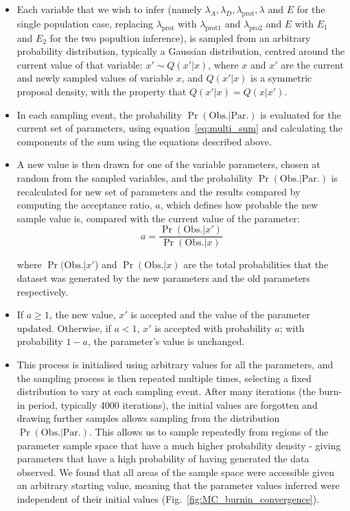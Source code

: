\begin{itemize}
\item Each variable that we wish to infer (namely $\lambda_A, \lambda_D, \lambda_{\text{prot}}, \lambda$ and $E$ for the single population case, replacing $\lambda_{\text{prot}}$ with $\lambda_{\text{prot1}}$ and $\lambda_{\text{pro2}}$ and $E$ with $E_1$ and $E_2$ for the two popultion inference), is sampled from an arbitrary probability distribution, typically a Gaussian distribution, centred around the current value of that variable: $x' \sim Q(x'|x) $, where $x$ and $x'$ are the current and newly sampled values of variable $x$, and $Q(x'|x)$ is a symmetric proposal density, with the property that $Q(x'|x) = Q(x|x')$. 
\item In each sampling event, the probability $\Pr(\text{Obs.} | \text{Par.})$ is evaluated for the current set of parameters, using equation~\ref{eq:multi_sum} and calculating the components of the sum using the equations described above.  

\item A new value is then drawn for one of the variable parameters, chosen at random from the sampled variables, and the probability $\Pr(\text{Obs.} | \text{Par.})$ is recalculated for new set of parameters and the results compared by computing the acceptance ratio, $a$, which defines how probable the new sample value is, compared with the current value of the parameter:
\begin{equation}
a = \frac{\Pr(\text{Obs.} | x')}{\Pr(\text{Obs.} | x)}
\end {equation}

where $\Pr(\text{Obs.} | x'$) and $\Pr(\text{Obs.} | x)$ are the total probabilities that the dataset was generated by the new parameters and the old parameters respectively.
\item  If $a \ge 1$, the new value, $x'$ is accepted and the value of the parameter updated.  Otherwise, if $a < 1$, $x'$ is accepted with probability $a$; with probability $1 - a$, the parameter's value is unchanged.
\item This process is initialised using arbitrary values for all the parameters, and the sampling process is then repeated multiple times, selecting a fixed distribution to vary at each sampling event. After many iterations (the burn-in period, typically 4000 iterations), the initial values are forgotten and drawing further samples allows sampling from the distribution $\Pr(\text{Obs.} | \text{Par.})$.  This allows us to sample repeatedly from regions of the parameter sample space that have a much higher probability density - giving parameters that have a high probability of having generated the data observed. We found that all areas of the sample space were accessible given an arbitrary starting value, meaning that the parameter values inferred were independent of their initial values (Fig.~\ref{fig:MC_burnin_convergence}).
\end{itemize}


